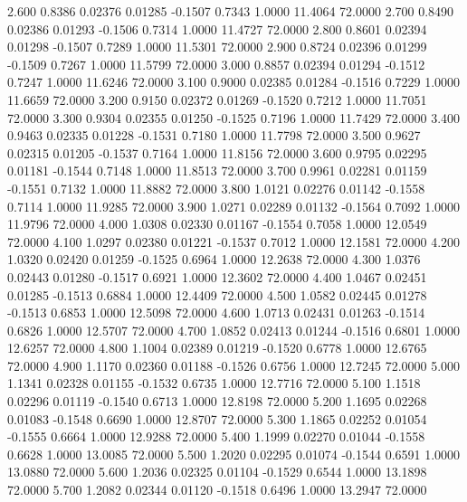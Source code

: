    2.600   0.8386   0.02376   0.01285  -0.1507   0.7343   1.0000  11.4064  72.0000
   2.700   0.8490   0.02386   0.01293  -0.1506   0.7314   1.0000  11.4727  72.0000
   2.800   0.8601   0.02394   0.01298  -0.1507   0.7289   1.0000  11.5301  72.0000
   2.900   0.8724   0.02396   0.01299  -0.1509   0.7267   1.0000  11.5799  72.0000
   3.000   0.8857   0.02394   0.01294  -0.1512   0.7247   1.0000  11.6246  72.0000
   3.100   0.9000   0.02385   0.01284  -0.1516   0.7229   1.0000  11.6659  72.0000
   3.200   0.9150   0.02372   0.01269  -0.1520   0.7212   1.0000  11.7051  72.0000
   3.300   0.9304   0.02355   0.01250  -0.1525   0.7196   1.0000  11.7429  72.0000
   3.400   0.9463   0.02335   0.01228  -0.1531   0.7180   1.0000  11.7798  72.0000
   3.500   0.9627   0.02315   0.01205  -0.1537   0.7164   1.0000  11.8156  72.0000
   3.600   0.9795   0.02295   0.01181  -0.1544   0.7148   1.0000  11.8513  72.0000
   3.700   0.9961   0.02281   0.01159  -0.1551   0.7132   1.0000  11.8882  72.0000
   3.800   1.0121   0.02276   0.01142  -0.1558   0.7114   1.0000  11.9285  72.0000
   3.900   1.0271   0.02289   0.01132  -0.1564   0.7092   1.0000  11.9796  72.0000
   4.000   1.0308   0.02330   0.01167  -0.1554   0.7058   1.0000  12.0549  72.0000
   4.100   1.0297   0.02380   0.01221  -0.1537   0.7012   1.0000  12.1581  72.0000
   4.200   1.0320   0.02420   0.01259  -0.1525   0.6964   1.0000  12.2638  72.0000
   4.300   1.0376   0.02443   0.01280  -0.1517   0.6921   1.0000  12.3602  72.0000
   4.400   1.0467   0.02451   0.01285  -0.1513   0.6884   1.0000  12.4409  72.0000
   4.500   1.0582   0.02445   0.01278  -0.1513   0.6853   1.0000  12.5098  72.0000
   4.600   1.0713   0.02431   0.01263  -0.1514   0.6826   1.0000  12.5707  72.0000
   4.700   1.0852   0.02413   0.01244  -0.1516   0.6801   1.0000  12.6257  72.0000
   4.800   1.1004   0.02389   0.01219  -0.1520   0.6778   1.0000  12.6765  72.0000
   4.900   1.1170   0.02360   0.01188  -0.1526   0.6756   1.0000  12.7245  72.0000
   5.000   1.1341   0.02328   0.01155  -0.1532   0.6735   1.0000  12.7716  72.0000
   5.100   1.1518   0.02296   0.01119  -0.1540   0.6713   1.0000  12.8198  72.0000
   5.200   1.1695   0.02268   0.01083  -0.1548   0.6690   1.0000  12.8707  72.0000
   5.300   1.1865   0.02252   0.01054  -0.1555   0.6664   1.0000  12.9288  72.0000
   5.400   1.1999   0.02270   0.01044  -0.1558   0.6628   1.0000  13.0085  72.0000
   5.500   1.2020   0.02295   0.01074  -0.1544   0.6591   1.0000  13.0880  72.0000
   5.600   1.2036   0.02325   0.01104  -0.1529   0.6544   1.0000  13.1898  72.0000
   5.700   1.2082   0.02344   0.01120  -0.1518   0.6496   1.0000  13.2947  72.0000
